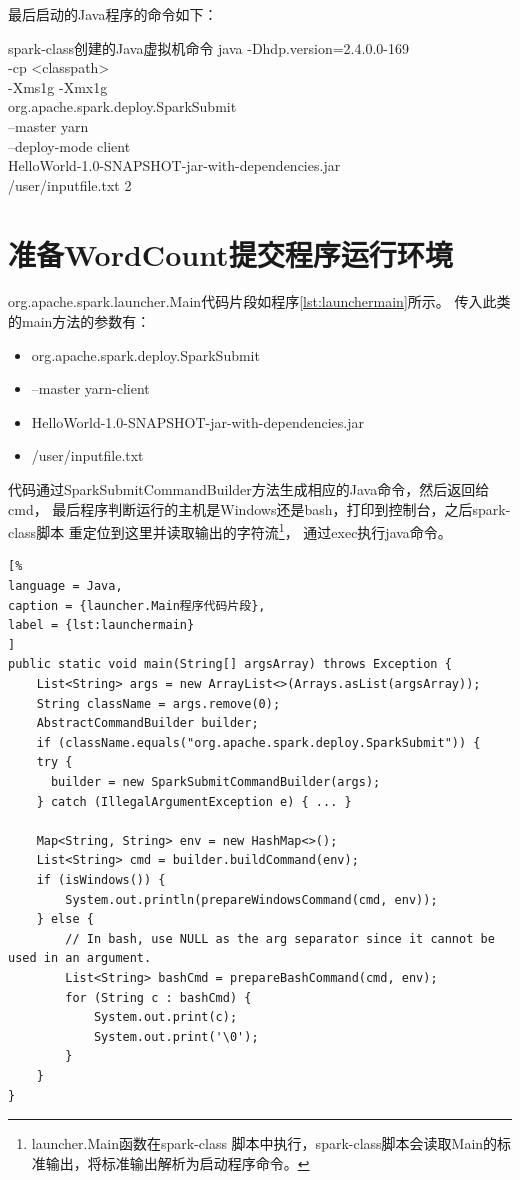 最后启动的Java程序的命令如下：
\begin{centertitlebox}{spark-class创建的Java虚拟机命令}
 java -Dhdp.version=2.4.0.0-169\\
	 -cp <classpath>\\
	 -Xms1g -Xmx1g\\
	 org.apache.spark.deploy.SparkSubmit\\
	 --master yarn\\ 
	 --deploy-mode client\\
	 HelloWorld-1.0-SNAPSHOT-jar-with-dependencies.jar\\
	 /user/inputfile.txt 2
\end{centertitlebox}

\section{准备WordCount提交程序运行环境}
\label{sec:runmain}

org.apache.spark.launcher.Main代码片段如程序\ref{lst:launchermain}所示。
传入此类的main方法的参数有：
\begin{itemize}
	\item org.apache.spark.deploy.SparkSubmit
	\item --master yarn-client
	\item HelloWorld-1.0-SNAPSHOT-jar-with-dependencies.jar
	\item /user/inputfile.txt
\end{itemize}
代码通过SparkSubmitCommandBuilder方法生成相应的Java命令，然后返回给cmd，
最后程序判断运行的主机是Windows还是bash，打印到控制台，之后spark-class脚本
重定位到这里并读取输出的字符流\footnote{launcher.Main函数在spark-class
脚本中执行，spark-class脚本会读取Main的标准输出，将标准输出解析为启动程序命令。}，
通过exec执行java命令。
\begin{lstlisting}[%
language = Java,
caption = {launcher.Main程序代码片段},
label = {lst:launchermain}
]
public static void main(String[] argsArray) throws Exception {
	List<String> args = new ArrayList<>(Arrays.asList(argsArray));
	String className = args.remove(0);
	AbstractCommandBuilder builder;
	if (className.equals("org.apache.spark.deploy.SparkSubmit")) {
	try {
	  builder = new SparkSubmitCommandBuilder(args);
	} catch (IllegalArgumentException e) { ... }
	
	Map<String, String> env = new HashMap<>();
	List<String> cmd = builder.buildCommand(env);	
	if (isWindows()) {
		System.out.println(prepareWindowsCommand(cmd, env));
	} else {
		// In bash, use NULL as the arg separator since it cannot be used in an argument.
		List<String> bashCmd = prepareBashCommand(cmd, env);
		for (String c : bashCmd) {
			System.out.print(c);
			System.out.print('\0');
		}
	}
}
\end{lstlisting}
